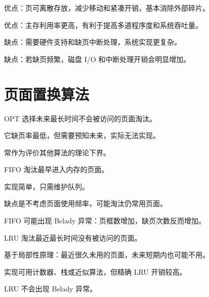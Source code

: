 \begin{points}
  \item 优点：页可离散存放，减少移动和紧凑开销，基本消除外部碎片。
  \item 优点：主存利用率更高，有利于提高多道程序度和系统吞吐量。
  \item 缺点：需要硬件支持和缺页中断处理，系统实现更复杂。
  \item 缺点：若缺页频繁，磁盘 I/O 和中断处理开销会明显增加。
\end{points}


\section{页面置换算法}
\begin{points}
  \item OPT 选择未来最长时间不会被访问的页面淘汰。
  \item 它缺页率最低，但需要预知未来，实际无法实现。
  \item 常作为评价其他算法的理论下界。
\end{points}


\begin{points}
  \item FIFO 淘汰最早进入内存的页面。
  \item 实现简单，只需维护队列。
  \item 缺点是不考虑页面使用频率，可能淘汰仍常用页面。
  \item FIFO 可能出现 Belady 异常：页框数增加，缺页次数反而增加。
\end{points}


\begin{points}
  \item LRU 淘汰最近最长时间没有被访问的页面。
  \item 基于局部性原理：最近很久未用的页面，未来短期内也可能不用。
  \item 实现可用计数器、栈或近似算法，但精确 LRU 开销较高。
  \item LRU 不会出现 Belady 异常。
\end{points}



